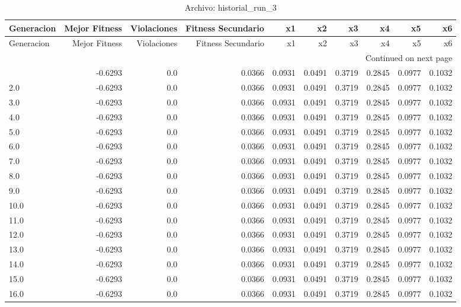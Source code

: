 \begin{longtable}{lrrrrrrrrr}
\caption{Archivo: historial\_run\_3}\label{tab:historial_run_3} \\
\toprule
Generacion & Mejor Fitness & Violaciones & Fitness Secundario & x1 & x2 & x3 & x4 & x5 & x6 \\
\midrule
\endfirsthead
\toprule
Generacion & Mejor Fitness & Violaciones & Fitness Secundario & x1 & x2 & x3 & x4 & x5 & x6 \\
\midrule
\endhead
\midrule
\multicolumn{10}{r}{Continued on next page} \\
\midrule
\endfoot
\bottomrule
\endlastfoot
1.0 & -0.6293 & 0.0 & 0.0366 & 0.0931 & 0.0491 & 0.3719 & 0.2845 & 0.0977 & 0.1032 \\
2.0 & -0.6293 & 0.0 & 0.0366 & 0.0931 & 0.0491 & 0.3719 & 0.2845 & 0.0977 & 0.1032 \\
3.0 & -0.6293 & 0.0 & 0.0366 & 0.0931 & 0.0491 & 0.3719 & 0.2845 & 0.0977 & 0.1032 \\
4.0 & -0.6293 & 0.0 & 0.0366 & 0.0931 & 0.0491 & 0.3719 & 0.2845 & 0.0977 & 0.1032 \\
5.0 & -0.6293 & 0.0 & 0.0366 & 0.0931 & 0.0491 & 0.3719 & 0.2845 & 0.0977 & 0.1032 \\
6.0 & -0.6293 & 0.0 & 0.0366 & 0.0931 & 0.0491 & 0.3719 & 0.2845 & 0.0977 & 0.1032 \\
7.0 & -0.6293 & 0.0 & 0.0366 & 0.0931 & 0.0491 & 0.3719 & 0.2845 & 0.0977 & 0.1032 \\
8.0 & -0.6293 & 0.0 & 0.0366 & 0.0931 & 0.0491 & 0.3719 & 0.2845 & 0.0977 & 0.1032 \\
9.0 & -0.6293 & 0.0 & 0.0366 & 0.0931 & 0.0491 & 0.3719 & 0.2845 & 0.0977 & 0.1032 \\
10.0 & -0.6293 & 0.0 & 0.0366 & 0.0931 & 0.0491 & 0.3719 & 0.2845 & 0.0977 & 0.1032 \\
11.0 & -0.6293 & 0.0 & 0.0366 & 0.0931 & 0.0491 & 0.3719 & 0.2845 & 0.0977 & 0.1032 \\
12.0 & -0.6293 & 0.0 & 0.0366 & 0.0931 & 0.0491 & 0.3719 & 0.2845 & 0.0977 & 0.1032 \\
13.0 & -0.6293 & 0.0 & 0.0366 & 0.0931 & 0.0491 & 0.3719 & 0.2845 & 0.0977 & 0.1032 \\
14.0 & -0.6293 & 0.0 & 0.0366 & 0.0931 & 0.0491 & 0.3719 & 0.2845 & 0.0977 & 0.1032 \\
15.0 & -0.6293 & 0.0 & 0.0366 & 0.0931 & 0.0491 & 0.3719 & 0.2845 & 0.0977 & 0.1032 \\
16.0 & -0.6293 & 0.0 & 0.0366 & 0.0931 & 0.0491 & 0.3719 & 0.2845 & 0.0977 & 0.1032 \\

\end{longtable}

